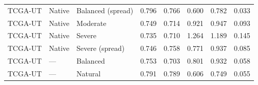 \begin{tabular}{lllrrrrr}
TCGA-UT & Native & Balanced (spread) & 0.796 & 0.766 & 0.600 & 0.782 & 0.033 \\
TCGA-UT & Native & Moderate & 0.749 & 0.714 & 0.921 & 0.947 & 0.093 \\
TCGA-UT & Native & Severe & 0.735 & 0.710 & 1.264 & 1.189 & 0.145 \\
TCGA-UT & Native & Severe (spread) & 0.746 & 0.758 & 0.771 & 0.937 & 0.085 \\
TCGA-UT & --- & Balanced & 0.753 & 0.703 & 0.801 & 0.932 & 0.058 \\
TCGA-UT & --- & Natural & 0.791 & 0.789 & 0.606 & 0.749 & 0.055 \\
\bottomrule
\end{tabular}

